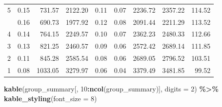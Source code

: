 \documentclass[
]{article}
\newenvironment{Shaded}{\begin{snugshade}}{\end{snugshade}}
\newcommand{\AttributeTok}[1]{\textcolor[rgb]{0.13,0.29,0.53}{#1}}
\newcommand{\DecValTok}[1]{\textcolor[rgb]{0.00,0.00,0.81}{#1}}
\newcommand{\FunctionTok}[1]{\textcolor[rgb]{0.13,0.29,0.53}{\textbf{#1}}}
\newcommand{\NormalTok}[1]{#1}
\newcommand{\SpecialCharTok}[1]{\textcolor[rgb]{0.81,0.36,0.00}{\textbf{#1}}}
\begin{document}
\begin{longtable}[t]{rrrrrrrrr}
5 & 0.15 & 731.57 & 2122.20 & 0.11 & 0.07 & 2236.72 & 2357.22 & 114.52\\
\addlinespace
6 & 0.16 & 690.73 & 1977.92 & 0.12 & 0.08 & 2091.44 & 2211.29 & 113.52\\
4 & 0.14 & 764.15 & 2249.57 & 0.10 & 0.07 & 2362.23 & 2480.33 & 112.66\\
3 & 0.13 & 821.25 & 2460.57 & 0.09 & 0.06 & 2572.42 & 2689.14 & 111.85\\
2 & 0.11 & 845.28 & 2585.54 & 0.08 & 0.06 & 2689.05 & 2796.52 & 103.51\\
1 & 0.08 & 1033.05 & 3279.97 & 0.06 & 0.04 & 3379.49 & 3481.85 & 99.52\\
\bottomrule
\end{longtable}
\endgroup{}

\begin{Shaded}
\begin{Highlighting}[]
\FunctionTok{kable}\NormalTok{(group\_summary[, }\DecValTok{10}\SpecialCharTok{:}\FunctionTok{ncol}\NormalTok{(group\_summary)], }\AttributeTok{digits =} \DecValTok{2}\NormalTok{) }\SpecialCharTok{\%\textgreater{}\%}
  \FunctionTok{kable\_styling}\NormalTok{(}\AttributeTok{font\_size =} \DecValTok{8}\NormalTok{)}
\end{Highlighting}
\end{Shaded}

\begingroup\fontsize{8}{10}\selectfont
\end{document}
